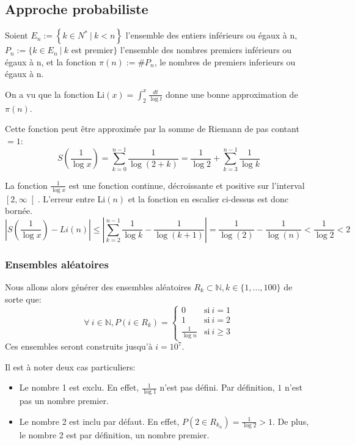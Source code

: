 \documentclass[../main.tex]{report}
\begin{document}
    \label{sec:test1}
    
\subsection{Approche probabiliste}
Soient $E_n := \left\{ k \in N^* ~|~k < n \right\}$ l'ensemble des entiers inférieurs ou égaux à n, $ P_n := \{k \in E_n~|~ k$ est premier$ \}$ l'ensemble des nombres premiers inférieurs ou égaux à n, et la fonction $\pi (n) := \#P_n$, le nombres de premiers inferieurs ou égaux à n.

On a vu que la fonction Li$(x) = \int_2^x \frac{dt}{\log t}$ 
donne une bonne approximation de $\pi(n)$.

Cette fonction peut être approximée par la somme de Riemann de pas contant $=1$:
\begin{equation}
\label{eq:SommeDeRiemann}
S(\frac{1}{\log x})
= \sum_{k=0}^{n-1} \frac{1}{\log(2 + k)}
= \frac{1}{\log 2} + \sum_{k=3}^{n-1} \frac{1}{\log k}
\end{equation}


La fonction $\frac{1}{\log x}$ est une fonction continue, décroissante et positive sur l'interval $\left[2, \infty \right[$. 
L'erreur entre Li$(n)$ et la fonction en escalier ci-dessus est donc bornée. 
 \[ 
\left| S(\frac{1}{\log x}) - Li(n) \right|
\leq \left| \sum_{k=2}^{n-1} \frac{1}{\log k} - \frac{1}{\log (k+1)} \right| 
 = \frac{1}{\log (2)} - \frac{1}{\log (n)}
 < \frac{1}{\log 2}
 < 2
 \]


\subsubsection{Ensembles aléatoires} 

Nous allons alors générer des ensembles aléatoires $R_{k} \subset \mathbb{N}, k \in \{1,...,100\}$ de sorte que:
\[
\forall~i \in \mathbb{N}, P(i \in R_{k}) = 
\left\{ 
    \begin{array}{cl}
         0 & \mbox{si}~i = 1 \\
         1 & \mbox{si}~i = 2 \\
         \frac{1}{\log n} & \mbox{si}~i \geq 3
    \end{array}
\right.
\]
Ces ensembles seront construits jusqu'à $i = 10^7$.

Il est à noter deux cas particuliers:
\begin{itemize} 
    \item Le nombre 1 est exclu. En effet, $\frac{1}{\log 1}$ n'est pas défini. Par définition, $1$ n'est pas un nombre premier.
    \item Le nombre 2 est inclu par défaut. En effet, $P(2 \in R_{k_n}) = \frac{1}{\log 2} > 1$. De plus, le nombre 2 est par définition, un nombre premier.
\end{itemize}
\end{document}
